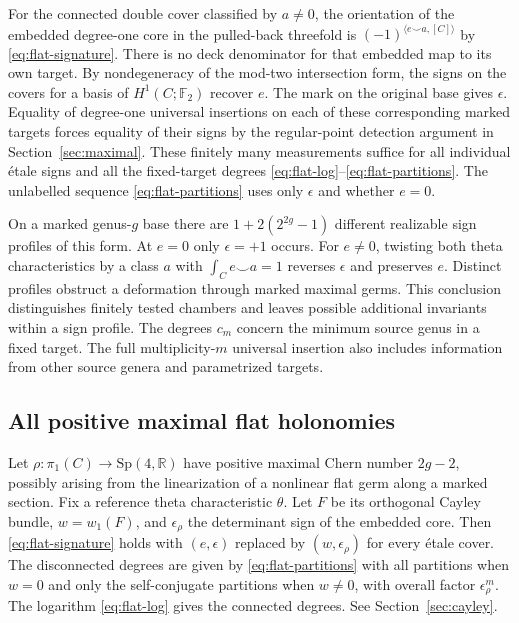 For the connected double cover classified by \(a\ne0\), the orientation of the embedded degree-one core in the pulled-back threefold is \((-1)^{\langle e\smile a,[C]\rangle}\) by \eqref{eq:flat-signature}. There is no deck denominator for that embedded map to its own target. By nondegeneracy of the mod-two intersection form, the signs on the covers for a basis of \(H^1(C;\mathbb F_2)\) recover \(e\). The mark on the original base gives \(\epsilon\). Equality of degree-one universal insertions on each of these corresponding marked targets forces equality of their signs by the regular-point detection argument in Section~\ref{sec:maximal}. These finitely many measurements suffice for all individual étale signs and all the fixed-target degrees \eqref{eq:flat-log}--\eqref{eq:flat-partitions}. The unlabelled sequence \eqref{eq:flat-partitions} uses only \(\epsilon\) and whether \(e=0\).

On a marked genus-\(g\) base there are \(1+2(2^{2g}-1)\) different realizable sign profiles of this form. At \(e=0\) only \(\epsilon=+1\) occurs. For \(e\ne0\), twisting both theta characteristics by a class \(a\) with \(\int_C e\smile a=1\) reverses \(\epsilon\) and preserves \(e\). Distinct profiles obstruct a deformation through marked maximal germs. This conclusion distinguishes finitely tested chambers and leaves possible additional invariants within a sign profile. The degrees \(c_m\) concern the minimum source genus in a fixed target. The full multiplicity-\(m\) universal insertion also includes information from other source genera and parametrized targets.

\subsection{All positive maximal flat holonomies}

Let \(\rho:\pi_1(C)\to\mathrm{Sp}(4,\mathbb R)\) have positive maximal Chern number \(2g-2\), possibly arising from the linearization of a nonlinear flat germ along a marked section. Fix a reference theta characteristic \(\theta\). Let \(F\) be its orthogonal Cayley bundle, \(w=w_1(F)\), and \(\epsilon_\rho\) the determinant sign of the embedded core. Then \eqref{eq:flat-signature} holds with \((e,\epsilon)\) replaced by \((w,\epsilon_\rho)\) for every étale cover. The disconnected degrees are given by \eqref{eq:flat-partitions} with all partitions when \(w=0\) and only the self-conjugate partitions when \(w\ne0\), with overall factor \(\epsilon_\rho^m\). The logarithm \eqref{eq:flat-log} gives the connected degrees. See Section~\ref{sec:cayley}.

